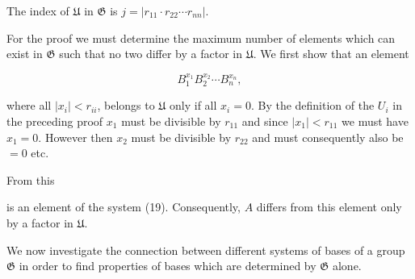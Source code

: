 The index of $\mathfrak{U}$ in $\mathfrak{G}$ is $j = |r_{11} \cdot r_{22} \cdots r_{nn}|$.

For the proof we must determine the maximum number of elements which can exist in $\mathfrak{G}$ such that no two differ by a factor in $\mathfrak{U}$. We first show that an element

$$B_1^{x_1} B_2^{x_2} \cdots B_n^{x_n},$$

where all $|x_i| < r_{ii}$, belongs to $\mathfrak{U}$ only if all $x_i = 0$. By the definition of the $U_i$ in the preceding proof $x_1$ must be divisible by $r_{11}$ and since $|x_1| < r_{11}$ we must have $x_1 = 0$. However then $x_2$ must be divisible by $r_{22}$ and must consequently also be $= 0$ etc.

From this

is an element of the system (19). Consequently, $A$ differs from this element only by a factor in $\mathfrak{U}$.

We now investigate the connection between different systems of bases of a group $\mathfrak{G}$ in order to find properties of bases which are determined by $\mathfrak{G}$ alone.
